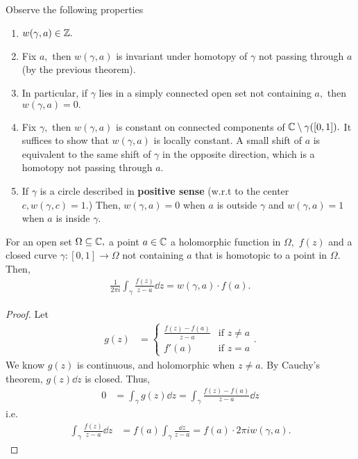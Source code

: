 \documentclass[a4paper,12pt]{article}
\begin{document}
Observe the following properties \begin{enumerate}
    \item $w(\gamma,a)\in\mathbb{Z}.$
    \item Fix $a,$ then $w(\gamma,a)$ is invariant under homotopy of $\gamma$ not passing through $a$ (by the previous theorem).
    \item In particular, if $\gamma$ lies in a simply connected open set not containing $a,$ then $w(\gamma,a)=0.$
    \item Fix $\gamma,$ then $w(\gamma,a)$ is constant on connected components of $\mathbb{C}\setminus\gamma([0,1]).$ It suffices to show that $w(\gamma,a)$ is locally constant. A small shift of $a$ is equivalent to the same shift of $\gamma$ in the opposite direction, which is a homotopy not passing through $a.$
    \item If $\gamma$ is a circle described in \textbf{positive sense} (w.r.t to the center $c,w(\gamma,c)=1.$) Then, $w(\gamma,a)=0$ when $a$ is outside $\gamma$ and $w(\gamma,a)=1$ when $a$ is inside $\gamma.$
\end{enumerate}
\begin{theorem}
    For an open set $\Omega\subseteq\mathbb{C},$ a point $a\in\mathbb{C}$ a holomorphic function in $\Omega,$ $f(z)$ and a closed curve $\gamma:[0,1]\to\Omega$ not containing $a$ that is homotopic to a point in $\Omega.$ Then, \begin{align}
        \frac{1}{2\pi i}\int_\gamma\frac{f(z)}{z-a}\dd z=w(\gamma,a)\cdot f(a).
    \end{align}
    \begin{proof}
        Let \begin{align}
            g(z)&=\begin{cases}
                \frac{f(z)-f(a)}{z-a}&\text{if }z\neq a\\
                f'(a)&\text{if }z=a
            \end{cases}.
        \end{align}
        We know $g(z)$ is continuous, and holomorphic when $z\neq a.$ By Cauchy's theorem, $g(z)\dd z$ is closed. Thus, \begin{align}
            0&=\int_\gamma g(z)\dd z=\int_\gamma\frac{f(z)-f(a)}{z-a}\dd z
        \end{align}
        i.e. \begin{align}
            \int_\gamma\frac{f(z)}{z-a}\dd z&=f(a)\int_\gamma\frac{\dd z}{z-a}=f(a)\cdot 2\pi iw(\gamma,a).
        \end{align}
    \end{proof}
\end{theorem}
\end{document}
